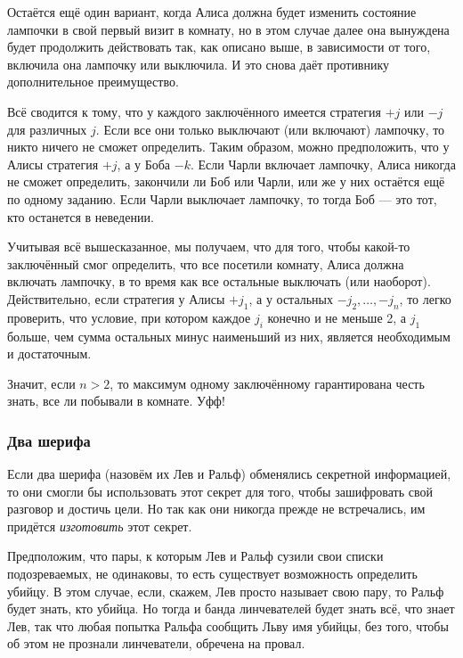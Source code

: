 Остаётся ещё один вариант, когда Алиса должна будет изменить состояние лампочки в свой первый визит в комнату, но в этом случае далее она вынуждена будет продолжить действовать так, как описано выше, в зависимости от того, включила она лампочку или выключила.
И это снова даёт противнику дополнительное преимущество.

Всё сводится к тому, что у каждого заключённого имеется стратегия $+j$ или $-j$ для различных $j$.
Если все они только выключают (или включают) лампочку, то никто ничего не сможет определить.
Таким образом, можно предположить, что у Алисы стратегия $+j$, а у Боба $-k$.
Если Чарли включает лампочку, Алиса никогда не сможет определить, закончили ли Боб или Чарли, или же у них остаётся ещё по одному заданию.
Если Чарли выключает лампочку, то тогда Боб --- это тот, кто останется в неведении.

Учитывая всё вышесказанное, мы получаем, что для того, чтобы какой-то заключённый смог определить, что все посетили комнату,
Алиса должна включать лампочку, в то время как все остальные выключать (или наоборот).
Действительно, если стратегия у Алисы $+j_1$, а у остальных  $-j_2,\dots,-j_n$, то легко проверить, что условие, при котором каждое $j_i$ конечно и не меньше 2, а $j_1$ больше, чем сумма остальных минус наименьший из них, является необходимым и достаточным.

Значит, если $n>2$, то максимум одному заключённому гарантирована честь знать, все ли побывали в комнате.
Уфф!

\subsubsection*{Два шерифа}%

Если два шерифа (назовём их Лев и Ральф) обменялись секретной информацией, то они смогли бы использовать этот секрет для того, чтобы зашифровать свой разговор и достичь цели.
Но так как они никогда прежде не встречались, им придётся \emph{изготовить} этот секрет.

\medskip

Предположим, что пары, к которым Лев и Ральф сузили свои списки подозреваемых, не одинаковы, то есть существует возможность определить убийцу.
В этом случае, если, скажем, Лев просто называет свою пару, то Ральф будет знать, кто убийца.
Но тогда и банда линчевателей будет знать всё, что знает Лев, так что любая попытка Ральфа сообщить Льву имя убийцы, без того, чтобы об этом не прознали линчеватели, обречена на провал.

